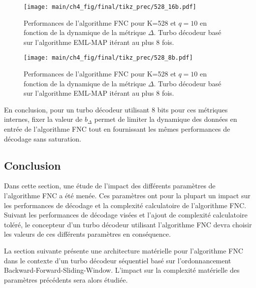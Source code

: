 \begin{figure}[!h]
	\centering
	\texttt{[image: main/ch4\_fig/final/tikz\_prec/528\_16b.pdf]}
	\caption{Performances de l'algorithme FNC pour K=528 et $q=10$ en fonction de la dynamique de la métrique $\Delta$.
	Turbo décodeur basé sur l'algorithme EML-MAP itérant au plus 8 fois.
	\label{fig:fnc_fp_16b}}
\end{figure}

\begin{figure}[!h]
	\centering
	\texttt{[image: main/ch4\_fig/final/tikz\_prec/528\_8b.pdf]}
	\caption{Performances de l'algorithme FNC pour K=528 et $q=10$ en fonction de la dynamique de la métrique $\Delta$.
	Turbo décodeur basé sur l'algorithme EML-MAP itérant au plus 8 fois.
	\label{fig:fnc_fp_8b}}
\end{figure}

En conclusion, pour un turbo décodeur utilisant 8 bits pour ces métriques internes, fixer la valeur de $b_{\Delta}$ 
permet de limiter la dynamique des données en entrée de l'algorithme FNC tout en fournissant les mêmes performances de
décodage sans saturation.

\subsection{Conclusion}
Dans cette section, une étude de l'impact des différents paramètres de l'algorithme FNC a été menée. Ces paramètres ont
pour la plupart un impact sur les performances de décodage et la complexité calculatoire de l'algorithme FNC. Suivant 
les performances de décodage visées et l'ajout de complexité calculatoire toléré, le concepteur d'un turbo décodeur 
utilisant l'algorithme FNC devra choisir les valeurs de ces différents paramètres en conséquence.

La section suivante présente une architecture matérielle pour l'algorithme FNC dans le contexte d'un turbo décodeur 
séquentiel basé sur l'ordonnancement Backward-Forward-Sliding-Window. L'impact sur la complexité matérielle des 
paramètres précédents sera alors étudiée.